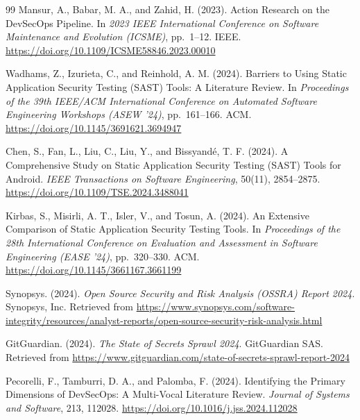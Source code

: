 \documentclass[12pt,a4paper]{report}
\begin{document}
\begin{thebibliography}{99}
Mansur, A., Babar, M. A., and Zahid, H. (2023). Action Research on the DevSecOps Pipeline. In \textit{2023 IEEE International Conference on Software Maintenance and Evolution (ICSME)}, pp.\ 1--12. IEEE. \url{https://doi.org/10.1109/ICSME58846.2023.00010}

Wadhams, Z., Izurieta, C., and Reinhold, A. M. (2024). Barriers to Using Static Application Security Testing (SAST) Tools: A Literature Review. In \textit{Proceedings of the 39th IEEE/ACM International Conference on Automated Software Engineering Workshops (ASEW '24)}, pp.\ 161--166. ACM. \url{https://doi.org/10.1145/3691621.3694947}

Chen, S., Fan, L., Liu, C., Liu, Y., and Bissyand\'{e}, T. F. (2024). A Comprehensive Study on Static Application Security Testing (SAST) Tools for Android. \textit{IEEE Transactions on Software Engineering}, 50(11), 2854--2875. \url{https://doi.org/10.1109/TSE.2024.3488041}

Kirbas, S., Misirli, A. T., Isler, V., and Tosun, A. (2024). An Extensive Comparison of Static Application Security Testing Tools. In \textit{Proceedings of the 28th International Conference on Evaluation and Assessment in Software Engineering (EASE '24)}, pp.\ 320--330. ACM. \url{https://doi.org/10.1145/3661167.3661199}

Synopsys. (2024). \textit{Open Source Security and Risk Analysis (OSSRA) Report 2024}. Synopsys, Inc. Retrieved from \url{https://www.synopsys.com/software-integrity/resources/analyst-reports/open-source-security-risk-analysis.html}

GitGuardian. (2024). \textit{The State of Secrets Sprawl 2024}. GitGuardian SAS. Retrieved from \url{https://www.gitguardian.com/state-of-secrets-sprawl-report-2024}

Pecorelli, F., Tamburri, D. A., and Palomba, F. (2024). Identifying the Primary Dimensions of DevSecOps: A Multi-Vocal Literature Review. \textit{Journal of Systems and Software}, 213, 112028. \url{https://doi.org/10.1016/j.jss.2024.112028}

\end{thebibliography}
\endgroup

\appendix
\end{document}
